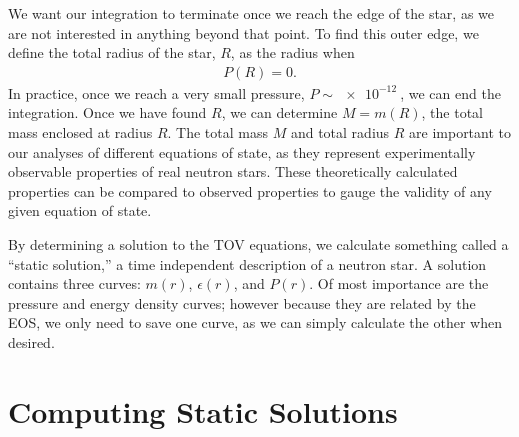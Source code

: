We want our integration to terminate once we reach the edge of the star, as we are not interested in anything beyond that point. To find this outer edge, we define the total radius of the star, $R$, as the radius when 
\begin{align}
    P(R) = 0.
\end{align}
In practice, once we reach a very small pressure, $P \sim \SI{e-12}{}$, we can end the integration. Once we have found $R$, we can determine $M = m(R)$, the total mass enclosed at radius $R$. The total mass $M$ and total radius $R$ are important to our analyses of different equations of state, as they represent experimentally observable properties of real neutron stars. These theoretically calculated properties can be compared to observed properties to gauge the validity of any given equation of state.

By determining a solution to the TOV equations, we calculate something called a ``static solution,'' a time independent description of a neutron star. A solution contains three curves: $m(r)$, $\epsilon(r)$, and $P(r)$. Of most importance are the pressure and energy density curves; however because they are related by the EOS, we only need to save one curve, as we can simply calculate the other when desired.


\section{Computing Static Solutions}\label{sec: tov, computing static solutions}

